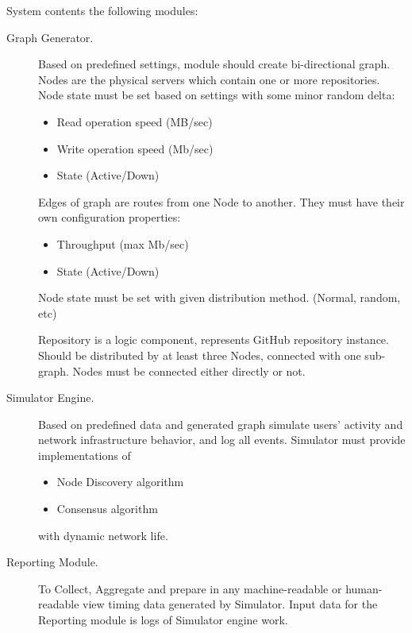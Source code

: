 \documentclass[12pt,oneside]{article}
\begin{document}
System contents the following modules:
\begin{description}
    \item[Graph Generator.]
    Based on predefined settings, module should create bi-directional graph. Nodes are the physical servers which contain one or more repositories. Node state must be set based on settings with some minor random delta:
    \begin{itemize}
        \item Read operation speed (MB/sec)
        \item Write operation speed (Mb/sec)
        \item State (Active/Down)
    \end{itemize}
    Edges of graph are routes from one Node to another. They must have their own configuration properties:
    \begin{itemize}
        \item Throughput (max Mb/sec)
        \item State (Active/Down)
    \end{itemize}
    Node state must be set with given distribution method. (Normal, random, etc)\par
    Repository is a logic component, represents GitHub repository instance. Should be distributed by at least three Nodes, connected with one sub-graph. Nodes must be connected either directly or not.
    
    \item[Simulator Engine.]
    Based on predefined data and generated graph simulate users' activity and network infrastructure behavior, and log all events. Simulator must provide implementations of
    \begin{itemize}
        \item Node Discovery algorithm
        \item Consensus algorithm
    \end{itemize}
    with dynamic network life.
    
    \item[Reporting Module.]
    To Collect, Aggregate and prepare in any machine-readable or human-readable view timing data generated by Simulator. Input data for the Reporting module is logs of Simulator engine work.
    
\end{description}

\printbibliography%
\end{document}
